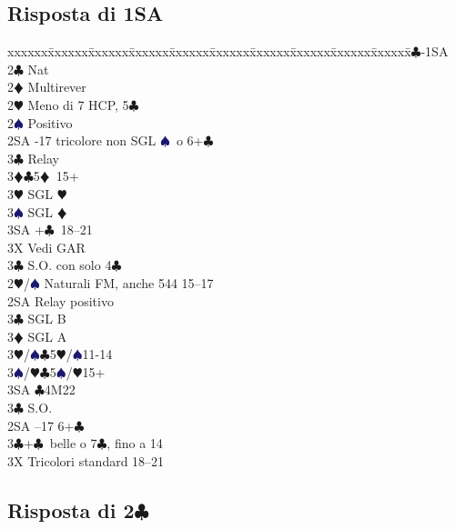 \documentclass[a4paper,italian]{article}
\newcommand{\BC}{\textcolor{OliveGreen}{$\clubsuit$}}
\newcommand{\BD}{\textcolor{RedOrange}{$\vardiamondsuit$}}
\newcommand{\BH}{\textcolor{Red2}{$\varheartsuit${}}}
\newcommand{\BS}{\textcolor{MidnightBlue}{$\spadesuit${}}}
\newcommand{\pdfc}{\texorpdfstring{\BC{}}{C}}
\newenvironment{bidtable}
{\begin{tabbing}

    xxxxxx\=xxxxxx\=xxxxxx\=xxxxxx\=xxxxxx\=xxxxxx\=xxxxxx\=xxxxxx\=xxxxxx\=xxxxxx\=\kill}
{\end{tabbing} }%
\begin{document}
\begin{multicols}{2}
    \subsection{Risposta di 1SA}

    \begin{bidtable}
        1\BC-1SA\+\\
        2\BC \> Nat\\
        2\BD \> Multirever\+\\
        2\BH \> Meno di 7 HCP, 5\BC \\
        2\BS \> Positivo\+\\
        2SA -17 tricolore non SGL \BS\ o 6+\BC \+\\
        3\BC \> Relay\+\\
        3\BD {}\BC5\BD\ 15+\\
        3\BH \> SGL \BH \\
        3\BS \> SGL \BD \\
        3SA +\BC\ 18--21\-\-\\
        3X \> Vedi GAR\-\\
        3\BC \> S.O. con solo 4\BC\-\\
        2\BH/\BS \> Naturali FM, anche 544 15--17\+\\
        2SA \> Relay positivo\+\\
        3\BC \> SGL B\\
        3\BD \> SGL A\\
        3\BH/\BS {}\BC 5\BH/\BS 11-14\\
        3\BS/\BH {}\BC 5\BS/\BH 15+\\
        3SA \BC 4M22\-\\
        3\BC \> S.O.\-\\
        2SA --17 6+\BC \\
        3\BC {}+\BC\ belle o 7\BC , fino a 14\\
        3X \> Tricolori standard 18--21\-
    \end{bidtable}
\end{multicols}

\newpage

\subsection{Risposta di 2\pdfc}
\end{document}
